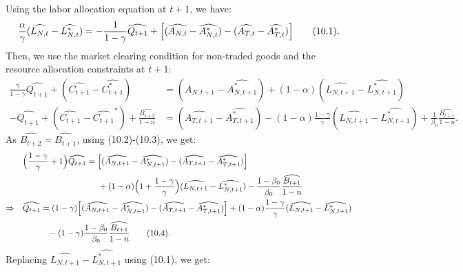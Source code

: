 \documentclass[a4paper,12pt]{article} %
\theoremstyle{nonitalic}
\begin{document}
Using the labor allocation equation at $ t+1 $, we have:
\[
\frac{\alpha}{\gamma} (\widehat{L_{N,t}} - \widehat{L_{N,t}^*}) = -\frac{1}{1-\gamma} \widehat{Q_{t+1}} + \Bigl[ (\widehat{A_{N,t}} - \widehat{A_{N,t}^*}) - (\widehat{A_{T,t}} - \widehat{A_{T,t}^*}) \Bigr] \tag{10.1}.
\]
Then, we use the market clearing condition for non-traded goods and the resource allocation constraints at $ t+1 $:
\begin{align*}
    \frac{\gamma}{1-\gamma} \widehat{Q_{t+1}} + (\widehat{C_{t+1}} - \widehat{C_{t+1}^*}) &= (\widehat{A_{N,t+1}} - \widehat{A_{N,t+1}^*}) + (1-\alpha )(\widehat{L_{N,t+1}} - \widehat{L_{N,t+1}^*}) \tag{10.2} \\
    -\widehat{Q_{t+1}} + (\widehat{C_{t+1}} - \widehat{C_{t+1}}^*) + \frac{\widehat{B_{t+2}}}{1-n} &= (\widehat{A_{T,t+1}} - \widehat{A_{T,t+1}^*}) - (1-\alpha) \frac{1-\gamma}{\gamma} (\widehat{L_{N,t+1}} - \widehat{L_{N,t+1}^*}) + \frac{1}{\beta_0} \frac{\widehat{B_{t+1}}}{1-n}. \tag{10.3}
\end{align*}
As $\widehat{B_{t+2}} = \widehat{B_{t+1}}$, using (10.2)-(10.3), we get:
\begin{align*}
    & \quad \Bigl(\frac{1-\gamma}{\gamma} + 1 \Bigr) \widehat{Q_{t+1}} = \Bigl[ (\widehat{A_{N,t+1}} - \widehat{A_{N,t+1}^*}) - (\widehat{A_{T,t+1}} - \widehat{A_{T,t+1}^*}) \Bigr] \\
    &\quad\quad\quad\quad\quad\quad\quad\quad\quad\quad + (1-\alpha) \Bigl(1 + \frac{1-\gamma}{\gamma}\Bigr) (\widehat{L_{N,t+1}} - \widehat{L_{N,t+1}^*}) - \frac{1-\beta_0}{\beta_0} \frac{\widehat{B_{t+1}}}{1-n} \\
    \Rightarrow & \quad \widehat{Q_{t+1}} = (1-\gamma)\Bigl[ (\widehat{A_{N,t+1}} - \widehat{A_{N,t+1}^*}) - (\widehat{A_{T,t+1}} - \widehat{A_{T,t+1}^*}) \Bigr] + (1-\alpha) \frac{1-\gamma}{\gamma} (\widehat{L_{N,t+1}} - \widehat{L_{N,t+1}^*}) \\ 
    &\quad\quad\quad\quad- (1-\gamma) \frac{1-\beta_0}{\beta_0} \frac{\widehat{B_{t+1}}}{1-n} \tag{10.4}.
\end{align*}
Replacing $\widehat{L_{N,t+1}} - \widehat{L_{N,t+1}^*}$ using (10.1), we get:
\end{document}
